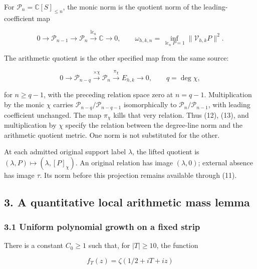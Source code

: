 For \(\mathcal P_n=\mathbb C[S]_{\le n}\), the monic norm is the quotient norm of the leading-coefficient map

\[
 0\longrightarrow\mathcal P_{n-1}\longrightarrow\mathcal P_n
 \xrightarrow{\operatorname{lc}_n}\mathbb C\longrightarrow0,
 \qquad
 \omega_{h,k,n}=\inf_{\operatorname{lc}_nP=1}\|\mathcal V_{h,k}P\|^2.
                                                                         \tag{12}
\]

The arithmetic quotient is the other specified map from the same source:

\[
 0\longrightarrow\mathcal P_{n-q}
 \xrightarrow{\times\chi}\mathcal P_n
 \xrightarrow{\pi_\chi}E_{h,k}\longrightarrow0,\qquad q=\deg\chi,
                                                                         \tag{13}
\]

for \(n\ge q-1\), with the preceding relation space zero at \(n=q-1\). Multiplication by the monic \(\chi\) carries \(\mathcal P_{n-q}/\mathcal P_{n-q-1}\) isomorphically to \(\mathcal P_n/\mathcal P_{n-1}\), with leading coefficient unchanged. The map \(\pi_\chi\) kills that very relation. Thus (12), (13), and multiplication by \(\chi\) specify the relation between the degree-line norm and the arithmetic quotient metric. One norm is not substituted for the other.

At each admitted original support label \(\lambda\), the lifted quotient is \((\lambda,P)\mapsto(\lambda,[P]_\chi)\). An original relation has image \((\lambda,0)\); external absence has image \(\tau\). Its norm before this projection remains available through (11).

\subsection{3. A quantitative local arithmetic mass lemma}\label{zlm:endpoint-arithmetic_original--a-quantitative-local-arithmetic-mass-lemma}

\subsubsection{3.1 Uniform polynomial growth on a fixed strip}\label{zlm:endpoint-arithmetic_original--uniform-polynomial-growth-on-a-fixed-strip}

There is a constant \(C_0\ge1\) such that, for \(|T|\ge10\), the function

\[
 f_T(z)=\zeta(1/2+iT+iz)                                                \tag{14}
\]

